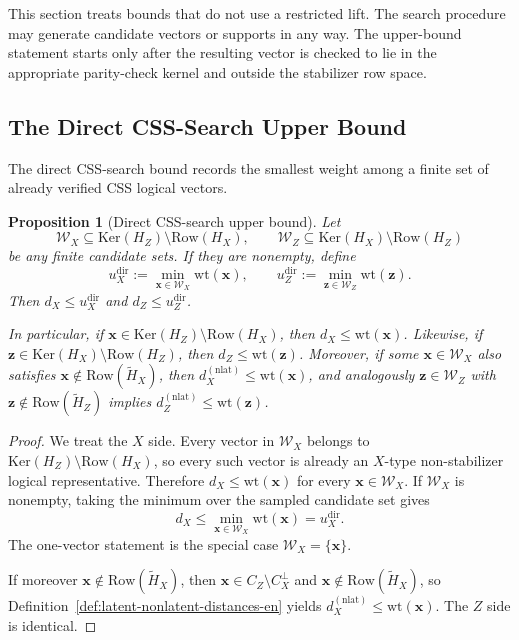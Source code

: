 \documentclass[11pt]{article}
\newcommand{\Ker}{\mathrm{Ker}}
\newcommand{\Row}{\mathrm{Row}}
\newcommand{\wt}{\mathrm{wt}}
\newcommand{\Htil}{\tilde{H}}
\newcommand{\vect}[1]{\bm{#1}}
\newcommand{\vx}{\vect{x}}
\newcommand{\vz}{\vect{z}}
\theoremstyle{uprightthm}
\newtheorem{proposition}[theorem]{Proposition}
\begin{document}
This section treats bounds that do not use a restricted lift.  The search
procedure may generate candidate vectors or supports in any way.  The
upper-bound statement starts only after the resulting vector is checked to lie
in the appropriate parity-check kernel and outside the stabilizer row space.

\subsection{The Direct CSS-Search Upper Bound}
\label{sec:direct-css-search-en}
The direct CSS-search bound records the smallest weight among a finite set of
already verified CSS logical vectors.

\begin{proposition}[Direct CSS-search upper bound]
\label{prop:direct-css-upper-en}
Let
\[
\mathcal{W}_X\subseteq \Ker(H_Z)\setminus \Row(H_X),\qquad
\mathcal{W}_Z\subseteq \Ker(H_X)\setminus \Row(H_Z)
\]
be any finite candidate sets.
If they are nonempty, define
\[
u_X^{\mathrm{dir}}:=\min_{\vx\in\mathcal{W}_X}\wt(\vx),\qquad
u_Z^{\mathrm{dir}}:=\min_{\vz\in\mathcal{W}_Z}\wt(\vz).
\]
Then $d_X\le u_X^{\mathrm{dir}}$ and $d_Z\le u_Z^{\mathrm{dir}}$.

In particular, if $\vx\in\Ker(H_Z)\setminus \Row(H_X)$, then
$d_X\le \wt(\vx)$. Likewise, if
$\vz\in\Ker(H_X)\setminus \Row(H_Z)$, then
$d_Z\le \wt(\vz)$.
Moreover, if some $\vx\in\mathcal{W}_X$ also satisfies
$\vx\notin \Row(\Htil_X)$, then
$d_X^{(\mathrm{nlat})}\le \wt(\vx)$, and analogously
$\vz\in\mathcal{W}_Z$ with $\vz\notin \Row(\Htil_Z)$ implies
$d_Z^{(\mathrm{nlat})}\le \wt(\vz)$.
\end{proposition}

\begin{proof}
We treat the $X$ side. Every vector in $\mathcal{W}_X$ belongs to
$\Ker(H_Z)\setminus \Row(H_X)$, so every such vector is already an $X$-type
non-stabilizer logical representative. Therefore
$d_X\le \wt(\vx)$ for every $\vx\in\mathcal{W}_X$.
If $\mathcal{W}_X$ is nonempty, taking the minimum over the sampled candidate
set gives
\[
d_X\le \min_{\vx\in\mathcal{W}_X}\wt(\vx)=u_X^{\mathrm{dir}}.
\]
The one-vector statement is the special case $\mathcal{W}_X=\{\vx\}$.

If moreover $\vx\notin\Row(\Htil_X)$, then
$\vx\in C_Z\setminus C_X^\perp$ and $\vx\notin \Row(\Htil_X)$,
so Definition~\ref{def:latent-nonlatent-distances-en} yields
$d_X^{(\mathrm{nlat})}\le \wt(\vx)$.
The $Z$ side is identical.
\end{proof}
\end{document}
